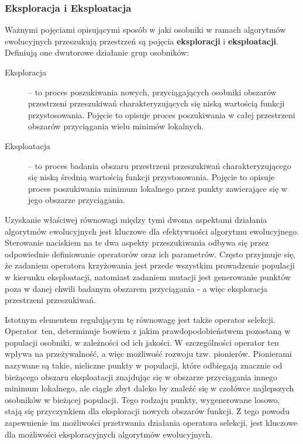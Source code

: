 \documentclass[12pt,a4paper]{report}
\begin{document}
{{\subsubsection{Eksploracja i Eksploatacja}
\par{
Ważnymi pojęciami opisującymi sposób w jaki osobniki w ramach algorytmów ewolucyjnych przeszukują przestrzeń są pojęcia \textbf{eksploracji} i \textbf{eksploatacji}. Definiują one dwutorowe działanie grup osobników:
\begin{description}
  \item[Eksploracja] -- to proces poszukiwania nowych, przyciągających osobniki obszarów przestrzeni przeszukiwań charakteryzujących się niską wartością funkcji przystosowania. Pojęcie to opisuje proces poszukiwania w całej przestrzeni obszarów przyciągania wielu minimów lokalnych. 
  \item[Eksploatacja] -- to proces badania obszaru przestrzeni przeszukiwań charakteryzującego się niską średnią wartością funkcji przystosowania. Pojęcie to opisuje proces poszukiwania minimum lokalnego przez punkty zawierające się w jego obszarze przyciągania.
\end{description}
}
\par{
Uzyskanie właściwej równowagi między tymi dwoma aspektami działania algorytmów ewolucyjnych jest kluczowe dla efektywności algorytmu ewolucyjnego. Sterowanie naciskiem na te dwa aspekty przeszukiwania odbywa się przez odpowiednie definiowanie operatorów oraz ich parametrów. Często przyjmuje się, że zadaniem operatora krzyżowania jest przede wszystkim prowadzenie populacji w kierunku eksploatacji, natomiast zadaniem mutacji jest generowanie punktów poza w danej chwili badanym obszarem przyciągania - a więc eksploracja przestrzeni przeszukiwań.
}
\par{
Istotnym elementem regulującym tę równowagę jest także operator selekcji. Operator~ten, determinuje bowiem z jakim prawdopodobieństwem pozostaną w populacji osobniki, w zależności od ich jakości. W szczególności operator ten wpływa na przeżywalność, a więc możliwość rozwoju tzw. pionierów. Pionierami nazywane są takie, nieliczne punkty w populacji, które odbiegają znacznie od bieżącego obszaru eksploatacji znajdując się w obszarze przyciągania innego minimum lokalnego, ale ciągle zbyt daleko by znaleźć się w czołówce najlepszych osobników w bieżącej populacji. Tego rodzaju punkty, wygenerowane losowo, stają się przyczynkiem dla eksploracji nowych obszarów funkcji. Z tego powodu zapewnienie im możliwości przetrwania działania operatora selekcji, jest kluczowe dla możliwości eksploracyjnych algorytmów ewolucyjnych.
}

}}
\end{document}

